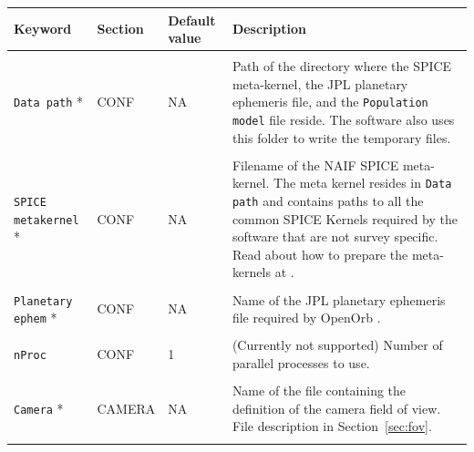 \documentclass[10pt,a4paper]{article}
\begin{document}
\begin{longtable}{l l p{20mm} p{50mm}}
    \hline
    Keyword                   & Section  & Default value & Description\\
    \hline \hline \\
    \verb+Data path+ *        & CONF         & NA             & Path of the directory where the SPICE meta-kernel,
                                                               the JPL planetary ephemeris file, and the \verb+Population model+ file reside. 
                                                               The software also uses this folder to write the temporary files.\\ \\
                                                               
    \verb+SPICE metakernel+ * & CONF         & NA             & Filename of the NAIF SPICE meta-kernel.
                                                               The meta kernel resides in \verb+Data path+
                                                               and contains paths to
                                                               all the common SPICE Kernels
                                                               required by the software that are
                                                               not survey specific. Read about
                                                               how to prepare the meta-kernels at
                                                               \citep{spice}.\\ \\
                                                   
    \verb+Planetary ephem+ *  & CONF          & NA            & Name of the JPL planetary ephemeris file required
                                                               by OpenOrb \citep{openorb}.\\ \\
                                                   
                                                   
    \verb+nProc+              & CONF          & 1             & (Currently not supported) Number of 
                                                               parallel processes to use. \\ \\
  
    \verb+Camera+ *           & CAMERA        & NA            & Name of the file containing the definition of 
                                                               the camera field of view. File description in Section~\ref{sec:fov}. \\ \\
   

\end{longtable}
\end{document}
